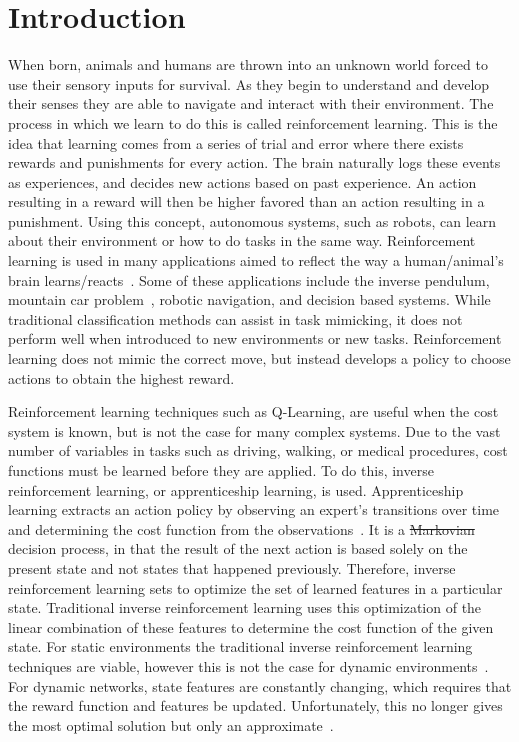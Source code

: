 \documentclass[12pt,american]{report}
\providecommand{\DIFaddtex}[1]{{\protect\color{blue}\uwave{#1}}} %
\providecommand{\DIFdeltex}[1]{{\protect\color{red}\sout{#1}}}                      %
\providecommand{\DIFaddbegin}{} %
\providecommand{\DIFaddend}{} %
\providecommand{\DIFdelbegin}{} %
\providecommand{\DIFdelend}{} %
\providecommand{\DIFadd}[1]{\texorpdfstring{\DIFaddtex{#1}}{#1}} %
\providecommand{\DIFdel}[1]{\texorpdfstring{\DIFdeltex{#1}}{}} %
\newcommand{\DIFscaledelfig}{0.5}
\newlength{\DIFdelgraphicswidth} %
\newlength{\DIFdelgraphicsheight} %
\newcommand{\DIFaddincludegraphics}[2][]{{\color{blue}\fbox{\DIFOincludegraphics[#1]{#2}}}} %
\newcommand{\DIFdelincludegraphics}[2][]{%
\sbox{\DIFdelgraphicsbox}{\DIFOincludegraphics[#1]{#2}}%
\settoboxwidth{\DIFdelgraphicswidth}{\DIFdelgraphicsbox} %
\settoboxtotalheight{\DIFdelgraphicsheight}{\DIFdelgraphicsbox} %
\scalebox{\DIFscaledelfig}{%
\parbox[b]{\DIFdelgraphicswidth}{\usebox{\DIFdelgraphicsbox}\\[-\baselineskip] \rule{\DIFdelgraphicswidth}{0em}}\llap{\resizebox{\DIFdelgraphicswidth}{\DIFdelgraphicsheight}{%
\setlength{\unitlength}{\DIFdelgraphicswidth}%
\begin{picture}(1,1)%
\thicklines\linethickness{2pt} %
{\color[rgb]{1,0,0}\put(0,0){\framebox(1,1){}}}%
{\color[rgb]{1,0,0}\put(0,0){\line( 1,1){1}}}%
{\color[rgb]{1,0,0}\put(0,1){\line(1,-1){1}}}%
\end{picture}%
}\hspace*{3pt}}} %
} %
\DeclareRobustCommand{\DIFaddbegin}{\DIFOaddbegin \let\includegraphics\DIFaddincludegraphics} %
\DeclareRobustCommand{\DIFaddend}{\DIFOaddend \let\includegraphics\DIFOincludegraphics} %
\DeclareRobustCommand{\DIFdelbegin}{\DIFOdelbegin \let\includegraphics\DIFdelincludegraphics} %
\DeclareRobustCommand{\DIFdelend}{\DIFOaddend \let\includegraphics\DIFOincludegraphics} %
\begin{document}

\body%
\chapter{Introduction}
When born, animals and humans are thrown into an unknown world forced to use their sensory inputs for survival. As they begin to understand and develop their senses they are able to  navigate  and  interact  with  their  environment.  The  process  in which  we  learn  to  do  this  is  called  reinforcement  learning.  This is  the  idea  that  learning  comes  from  a  series  of  trial  and  error where  there  exists  rewards  and  punishments  for  every  action. The brain naturally logs these events as experiences, and decides new  actions  based  on  past  experience. An  action  resulting  in  a reward  will  then  be  higher  favored  than  an  action  resulting  in a  punishment.  Using  this  concept,  autonomous  systems,  such  as robots, can learn about their environment or how to do tasks in the same way. Reinforcement learning is used in many applications aimed to reflect the way a human/animal's brain learns/reacts~\cite{atari}.  Some of these applications include the inverse pendulum, mountain car problem~\cite{sutton1996generalization}, robotic navigation, and decision based systems.  While traditional classification methods can assist in task mimicking, it does not perform well when introduced to new environments or new tasks.  Reinforcement learning does not mimic the correct move, but instead develops a policy to choose actions to obtain the highest reward.

Reinforcement learning techniques such as Q-Learning, are useful when the cost system is known, but is not the case for many complex systems. Due to the vast number of variables in tasks such as driving, walking, or medical procedures, cost functions must be learned before they are applied.  To do this, inverse reinforcement learning, or apprenticeship learning, is used. Apprenticeship learning extracts an action policy by observing an expert's transitions over time and determining the cost function from the observations~\cite{ngoinverse}. It is a \DIFdelbegin \DIFdel{Markovian }\DIFdelend \DIFaddbegin \DIFadd{Markov }\DIFaddend decision process, in that the result of the next action is based solely on the present state and not states that happened previously. Therefore, inverse reinforcement learning sets to optimize the set of learned features in a particular state. Traditional inverse reinforcement learning uses this optimization of the linear combination of these features to determine the cost function of the given state. For static environments the traditional inverse reinforcement learning techniques are viable, however this is not the case for dynamic environments~\cite{vasquez2014inverse}. For dynamic networks, state features are constantly changing, which requires that the reward function and features be updated.   Unfortunately, this no longer gives the most optimal solution but only an approximate~\cite{vasquez2014inverse}. 
\end{document}
